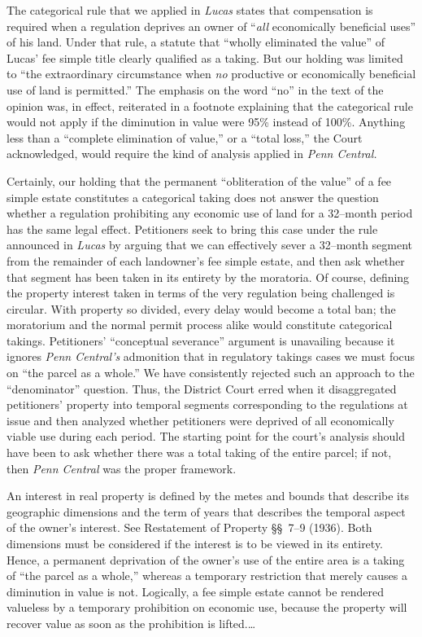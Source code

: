 The categorical rule that we applied in \textit{Lucas} states that compensation
is required when a regulation deprives an owner of ``\textit{all} economically
beneficial uses'' of his land. Under that rule, a statute that ``wholly
eliminated the value'' of Lucas' fee simple title clearly qualified as a taking.
But our holding was limited to ``the extraordinary circumstance when \textit{no}
productive or economically beneficial use of land is permitted.'' The emphasis
on the word ``no'' in the text of the opinion was, in effect, reiterated in a
footnote explaining that the categorical rule would not apply if the diminution
in value were 95\% instead of 100\%. Anything less than a ``complete elimination
of value,'' or a ``total loss,'' the Court acknowledged, would require the kind
of analysis applied in \textit{Penn Central.}

Certainly, our holding that the permanent ``obliteration of the value'' of a fee
simple estate constitutes a categorical taking does not answer the question
whether a regulation prohibiting any economic use of land for a 32--month period
has the same legal effect. Petitioners seek to bring this case under the rule
announced in \textit{Lucas} by arguing that we can effectively sever a 32--month
segment from the remainder of each landowner's fee simple estate, and then ask
whether that segment has been taken in its entirety by the moratoria. Of course,
defining the property interest taken in terms of the very regulation being
challenged is circular. With property so divided, every delay would become a
total ban; the moratorium and the normal permit process alike would constitute
categorical takings. Petitioners' ``conceptual severance'' argument is
unavailing because it ignores \textit{Penn Central's} admonition that in
regulatory takings cases we must focus on ``the parcel as a whole.'' We have
consistently rejected such an approach to the ``denominator'' question. Thus,
the District Court erred when it disaggregated petitioners' property into
temporal segments corresponding to the regulations at issue and then analyzed
whether petitioners were deprived of all economically viable use during each
period. The starting point for the court's analysis should have been to ask
whether there was a total taking of the entire parcel; if not, then \textit{Penn
Central} was the proper framework.

An interest in real property is defined by the metes and bounds that describe
its geographic dimensions and the term of years that describes the temporal
aspect of the owner's interest. See Restatement of Property \S\S~7--9 (1936).
Both dimensions must be considered if the interest is to be viewed in its
entirety. Hence, a permanent deprivation of the owner's use of the entire area
is a taking of ``the parcel as a whole,'' whereas a temporary restriction that
merely causes a diminution in value is not. Logically, a fee simple estate
cannot be rendered valueless by a temporary prohibition on economic use, because
the property will recover value as soon as the prohibition is lifted.\ldots


